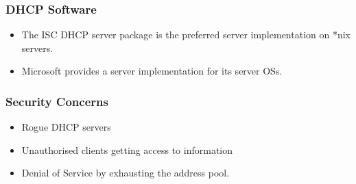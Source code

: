 \documentclass[10pt]{beamer}
\begin{document}
\begin{frame}
  \frametitle{DHCP Software}
  \begin{itemize}
    \item The ISC DHCP server package is the preferred server implementation 
          on *nix servers.
    \item Microsoft provides a server implementation for its server OSs.
  \end{itemize}  
\end{frame}

\begin{frame}
  \frametitle{Security Concerns}
  \begin{itemize}
    \item Rogue DHCP servers
    \item Unauthorised clients getting access to information
    \item Denial of Service by exhausting the address pool.
  \end{itemize}  
\end{frame}
\end{document}
